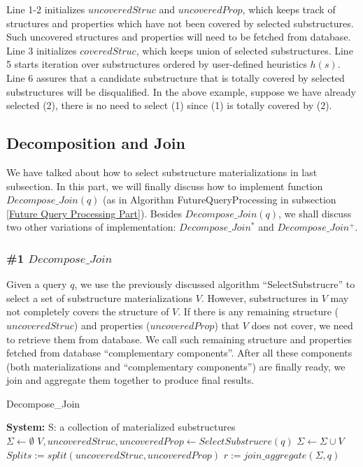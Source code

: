 Line 1-2 initializes $uncoveredStruc$ and $uncoveredProp$, which keeps track of structures and properties which have not been covered by selected substructures. Such uncovered structures and properties will need to be fetched from database. Line 3 initializes $coveredStruc$, which keeps union of selected substructures. Line 5 starts iteration over substructures ordered by user-defined heuristics $h(s)$. Line 6 assures that a candidate substructure that is totally covered by selected substructures will be disqualified. In the above example, suppose we have already selected (2), there is no need to select (1) since (1) is totally covered by (2). 

\subsection{Decomposition and Join}
\label{Query Decomposition}
We have talked about how to select substructure materializations in last subsection. In this part, we will finally discuss how to implement function $Decompose\_Join(q)$ (as in Algorithm FutureQueryProcessing in subsection \ref{Future Query Processing Part}). Besides $Decompose\_Join(q)$, we shall discuss two other variations of implementation: $Decompose\_Join^{*}$ and $Decompose\_Join^{+}$. 

\subsubsection{\#1 $Decompose\_Join$}
Given a query $q$, we use the previously discussed algorithm ``SelectSubstrucre'' to select a set of substructure materializations $V$. However, substructures in $V$ may not completely covers the structure of $V$. If there is any remaining structure ($uncoveredStruc$) and properties ($uncoveredProp$) that $V$ does not cover, we need to retrieve them from database. We call such remaining structure and properties fetched from database ``complementary  components''. After all these components (both materializations and ``complementary  components'') are finally ready, we join and aggregate them together to produce final results.

\begin{algorithm}[H]
\caption{Decompose\_Join}
\LinesNumbered
\textbf{System:} S: a collection of materialized substructures\\ 
$\Sigma \gets \emptyset $\;
$V, uncoveredStruc, uncoveredProp \gets SelectSubstrucre(q) $\;
$\Sigma \gets \Sigma \cup V $\;
$Splits:=split(uncoveredStruc, uncoveredProp)$\;
$r := join\_aggregate(\Sigma, q)$\;
\end{algorithm}

